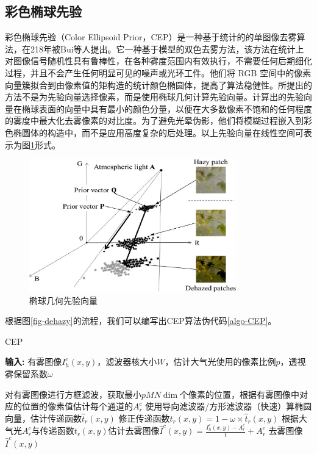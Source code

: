 \subsection{彩色椭球先验}
彩色椭球先验（Color Ellipsoid Prior，CEP）是一种基于统计的的单图像去雾算法，在218年被Bui等人提出\cite{bui.kim201802}。它一种基于模型的双色去雾方法，该方法在统计上对图像信号随机性具有鲁棒性，在各种雾度范围内有效执行，不需要任何后期细化过程，并且不会产生任何明显可见的噪声或光环工件。他们将 RGB 空间中的像素向量簇拟合到由像素值的矩构造的统计颜色椭圆体，提高了算法稳健性。所提出的方法不是为先验向量选择像素，而是使用椭球几何计算先验向量。计算出的先验向量在椭球表面的向量中具有最小的颜色分量，以便在大多数像素不饱和的任何程度的雾度中最大化去雾像素的对比度。为了避免光晕伪影，他们将模糊过程嵌入到彩色椭圆体的构造中，而不是应用高度复杂的后处理。以上先验向量在线性空间可表示为图\ref{fig-cep}形式。

\begin{figure}[htbp]
    \centering
    \includegraphics[width=0.8\textwidth]{./imgs/g713.png}
    \caption{椭球几何先验向量}
    \label{fig-cep}
 \end{figure}


 根据图\ref{fig-dehazy}的流程，我们可以编写出CEP算法伪代码\ref{algo-CEP}。

 \begin{algorithm}[t]
     \caption{CEP}
     \label{algo-CEP}
     \textbf{输入:} 有雾图像$I_h^c(x,y)$，滤波器核大小$W$，估计大气光使用的像素比例$p$，透视雾保留系数$\omega$
     \begin{algorithmic}
     \State 对有雾图像进行方框滤波，获取最小$pMN\dim$个像素的位置，根据有雾图像中对应的位置的像素值估计每个通道的$A_r^c$
     \State 使用导向滤波器/方形滤波器（快速）算椭圆向量，估计传递函数$\hat t_r(x,y)$
     \State 修正传递函数$t_r(x,y) = 1 - \omega\times \hat t_r(x,y)$
     \State 根据大气光$A_r^c$与传递函数$t_r(x,y)$估计去雾图像$\hat I^c(x,y) = \frac{I_h^c(x,y) - A_r^c}{t} + A_r^c$
     \State \Return 去雾图像$\hat I^c(x,y)$
     \end{algorithmic}
 \end{algorithm}
